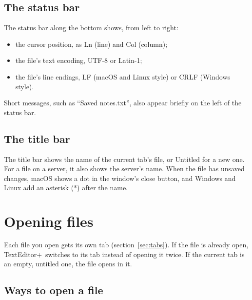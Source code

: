 \documentclass[11pt,a4paper]{article}
\newcommand{\appname}{TextEditor+}
\newcommand{\ui}[1]{\textsf{#1}}
\begin{document}
\subsection{The status bar}

The status bar along the bottom shows, from left to right:

\begin{itemize}
  \item the cursor position, as \ui{Ln} (line) and \ui{Col} (column);
  \item the file's text encoding, \ui{UTF-8} or \ui{Latin-1};
  \item the file's line endings, \ui{LF} (macOS and Linux style) or \ui{CRLF}
        (Windows style).
\end{itemize}

Short messages, such as ``Saved notes.txt'', also appear briefly on the left of
the status bar.

\subsection{The title bar}

The title bar shows the name of the current tab's file, or \ui{Untitled} for a
new one. For a file on a server, it also shows the server's name.
When the file has unsaved changes, macOS shows a dot in the window's close
button, and Windows and Linux add an asterisk (*) after the name.

\section{Opening files}\label{sec:opening}

Each file you open gets its own tab (section~\ref{sec:tabs}). If the file is
already open, \appname\ switches to its tab instead of opening it twice. If the
current tab is an empty, untitled one, the file opens in it.

\subsection{Ways to open a file}
\end{document}
